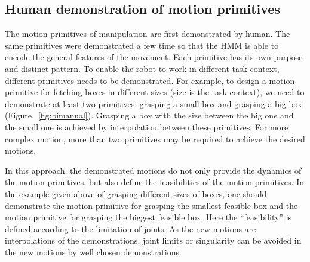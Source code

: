 \subsection{Human demonstration of motion primitives}
\label{cha5:sec2:demonstration}
The motion primitives of manipulation are first demonstrated by human. The same primitives were demonstrated a few time so that the HMM is able to encode the general features of the movement. Each primitive has its own purpose and distinct pattern. To enable the robot to work in different task context, different primitives needs to be demonstrated. For example, to design a motion primitive for fetching boxes in different sizes (size is the task context), we need to demonstrate at least two primitives: grasping a small box and grasping a big box (Figure.~\ref{fig:bimanual}). Grasping a box with the size between the big one and the small one is achieved by interpolation between these primitives. For more complex motion, more than two primitives may be required to achieve the desired motions.

In this approach, the demonstrated motions do not only provide the dynamics of the motion primitives, but also define the feasibilities of the motion primitives. In the example given above of grasping different sizes of boxes, one should demonstrate the motion primitive for grasping the smallest feasible box and the motion primitive for grasping the biggest feasible box. Here the ``feasibility'' is defined according to the limitation of joints. As the new motions are interpolations of the demonstrations, joint limits or singularity can be avoided in the new motions by well chosen demonstrations.

